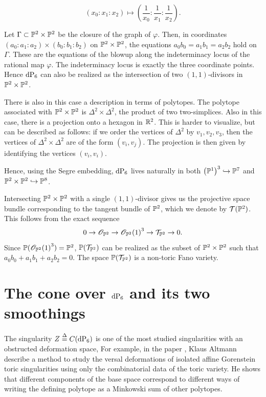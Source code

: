 \[
(x_0:x_1:x_2) \mapsto \left( \frac 1{x_0}: \frac 1{x_1}:\frac 1{x_2} \right).
\]

Let $\Gamma \subset \P^2 \times \P^2$ be the closure of the graph of $\varphi$. Then, in coordinates ${(a_0:a_1:a_2) \times(b_0:b_1:b_2)}$ on $\P^2 \times \P^2$, the equations $a_0b_0=a_1b_1=a_2b_2$ hold \label{eq:dp6_inp2p2} on $\Gamma$. These are the equations of the blowup along the indeterminacy locus of the rational map $\varphi$. The indeterminacy locus is exactly the three coordinate points. Hence $\dP6$ can also be realized as the intersection of two $(1,1)$-divisors in $\P^2 \times \P^2$. 

There is also in this case a description in terms of polytopes. The polytope associated with $\P^2 \times \P^2$ is $\Delta^2 \times \Delta^2$, the product of two two-simplices. Also in this case, there is a projection onto a hexagon in $\R^2$. This is harder to visualize, but can be described as follows: if we order the vertices of $\Delta^2$ by $v_1,v_2,v_3$, then the vertices of $\Delta^2 \times \Delta^2$ are of the form $(v_i,v_j)$. The projection is then given by identifying the vertices $(v_i,v_i)$. 

Hence, using the Segre embedding, $\dP6$ lives naturally in both ${\left( \P^1 \right)}^3 \hookrightarrow \P^7$ and $\P^2 \times \P^2 \hookrightarrow \P^8$. 

\begin{remark}
Intersecting $\P^2 \times \P^2$ with a single $(1,1)$-divisor gives us the projective space bundle corresponding to the tangent bundle of $\P^2$, which we denote by $\mathcal T(\P^2)$. This follows from the exact sequence
\[
0 \to \OO_{\P^2} \to {\OO_{\P^2}(1)}^3 \to \mathcal T_{\P^2} \to 0.
\]
Since $\P({\OO_{\P^2}(1)}^3)=\P^2$,  $\P(\mathcal T_{\P^2})$ can be realized as the subset of $\P^2 \times \P^2$ such that $a_0b_0+a_1b_1+a_2b_2=0$. The space $\P(\mathcal T_{\P^2})$ is a non-toric Fano variety.
\end{remark}

\section{The cone over \texorpdfstring{$\dP6$}{dP6} and its two smoothings}

The singularity $Z\stackrel{\Delta}{=} C(\dP6)$ is one of the most studied singularities with an obstructed deformation space, For example, in the paper \cite{altmann_versaldeformation}, Klaus Altmann describe a method to study the versal deformations of isolated affine Gorenstein toric singularities using only the combinatorial data of the toric variety. He shows that different components of the base space correspond to different ways of writing the defining polytope as a Minkowski sum of other polytopes.

